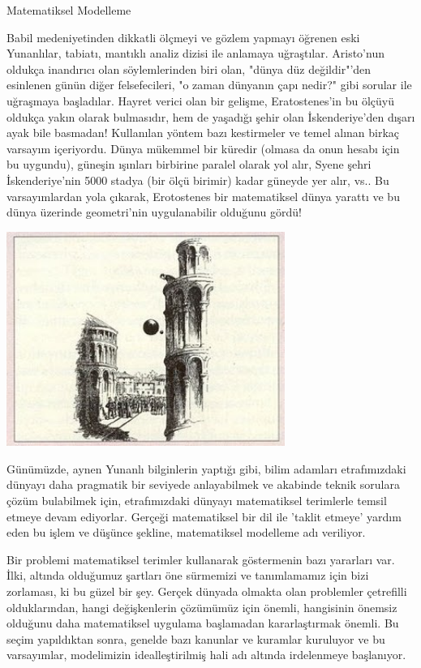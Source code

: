 \documentclass[12pt,fleqn]{article}\usepackage{../../common}
\begin{document}
Matematiksel Modelleme

Babil medeniyetinden dikkatli ölçmeyi ve gözlem yapmayı öğrenen eski
Yunanlılar, tabiatı, mantıklı analiz dizisi ile anlamaya
uğraştılar. Aristo'nun oldukça inandırıcı olan söylemlerinden biri olan,
"dünya düz değildir"'den esinlenen günün diğer felsefecileri, "o zaman
dünyanın çapı nedir?" gibi sorular ile uğraşmaya başladılar. Hayret verici
olan bir gelişme, Eratostenes'in bu ölçüyü oldukça yakın olarak bulmasıdır,
hem de yaşadığı şehir olan İskenderiye'den dışarı ayak bile basmadan!
Kullanılan yöntem bazı kestirmeler ve temel alınan birkaç varsayım
içeriyordu. Dünya mükemmel bir küredir (olmasa da onun hesabı için bu
uygundu), güneşin ışınları birbirine paralel olarak yol alır, Syene şehri
İskenderiye'nin 5000 stadya (bir ölçü birimir) kadar güneyde yer alır,
vs.. Bu varsayımlardan yola çıkarak, Erotostenes bir matematiksel dünya
yarattı ve bu dünya üzerinde geometri'nin uygulanabilir olduğunu gördü!

\includegraphics[height=7cm]{top_dusuyor_pizza_kulesi.jpg}

Günümüzde, aynen Yunanlı bilginlerin yaptığı gibi, bilim adamları
etrafımızdaki dünyayı daha pragmatik bir seviyede anlayabilmek ve akabinde
teknik sorulara çözüm bulabilmek için, etrafımızdaki dünyayı matematiksel
terimlerle temsil etmeye devam ediyorlar. Gerçeği matematiksel bir dil ile
'taklit etmeye' yardım eden bu işlem ve düşünce şekline, matematiksel
modelleme adı veriliyor.

Bir problemi matematiksel terimler kullanarak göstermenin bazı yararları
var. İlki, altında olduğumuz şartları öne sürmemizi ve tanımlamamız için
bizi zorlaması, ki bu güzel bir şey. Gerçek dünyada olmakta olan problemler
çetrefilli olduklarından, hangi değişkenlerin çözümümüz için önemli,
hangisinin önemsiz olduğunu daha matematiksel uygulama başlamadan
kararlaştırmak önemli. Bu seçim yapıldıktan sonra, genelde bazı kanunlar ve
kuramlar kuruluyor ve bu varsayımlar, modelimizin idealleştirilmiş hali adı
altında irdelenmeye başlanıyor.
\end{document}
